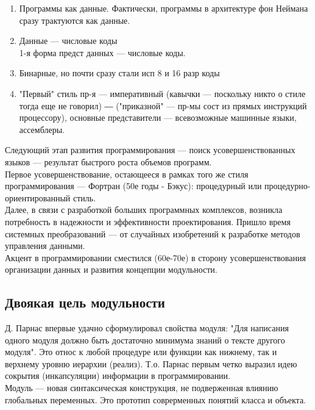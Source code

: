 \documentclass[main]{subfiles}
\begin{document}
    \begin{enumerate}
        \item Программы как данные. Фактически, программы в архитектуре фон Неймана сразу трактуются как данные.
        \item Данные --- числовые коды\\
        1-я форма предст данных --- числовые коды.
        \item Бинарные, но почти сразу стали исп 8 и 16 разр коды
        \item "Первый"{} стиль пр-я --- императивный (кавычки --- поскольку никто о стиле тогда еще не говорил) ― ("приказной"{} --- пр-мы сост из прямых инструкций процессору), основные представители --- всевозможные машинные языки, ассемблеры.
    \end{enumerate}

    Следующий этап развития программирования --- поиск усовершенствованных языков --- результат быстрого роста объемов программ.\\

    Первое усовершенствование, остающееся в рамках того же стиля программирования --- Фортран (50е годы - Бэкус): процедурный или процедурно-ориентированный стиль.\\

    Далее, в связи с разработкой больших программных комплексов, возникла потребность в надежности и эффективности проектирования. Пришло время системных преобразований --- от случайных изобретений к разработке методов управления данными.\\

    Акцент в программировании сместился (60е-70е) в сторону усовершенствования организации данных и развития концепции модульности.

    \subsection{Двоякая цель модульности}
    Д. Парнас впервые удачно сформулировал свойства модуля: "Для написания одного модуля должно быть достаточно минимума знаний о тексте другого модуля"{}. Это относ к любой процедуре или функции как нижнему, так и верхнему уровню иерархии (реализ). Т.о. Парнас первым четко выразил идею сокрытия (инкапсуляции) информации в программировании.\\

    Модуль --- новая синтаксическая конструкция, не подверженная влиянию глобальных переменных. Это прототип соврерменных понятий класса и объекта.
\end{document}
